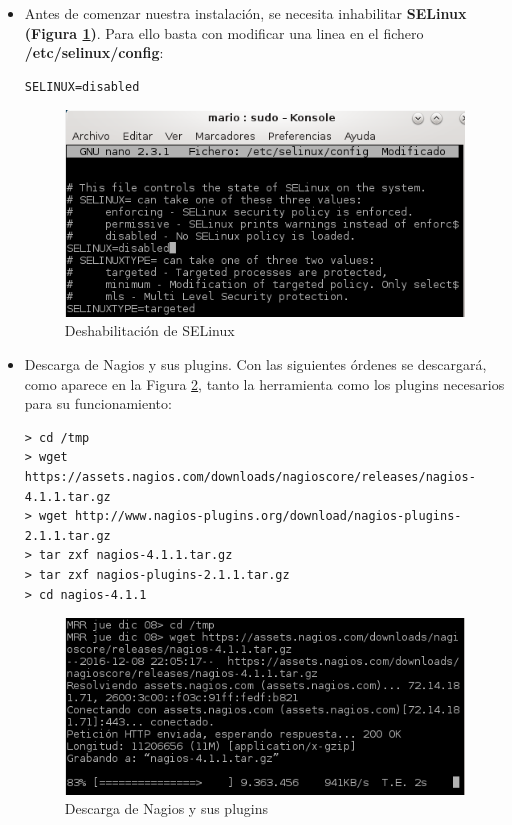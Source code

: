 \begin{itemize}
	\item Antes de comenzar nuestra instalación, se necesita inhabilitar \textbf{SELinux (Figura \ref{fig:figura123})}.
	Para ello basta con modificar una linea en el fichero \textbf{/etc/selinux/config}:
\begin{lstlisting}[style=fich]
SELINUX=disabled
\end{lstlisting}	
	\begin{figure}[H]
		\centering
		\includegraphics[scale=1]{figuras/ejercicio12/figura3.png} 
		\caption{Deshabilitación de SELinux} 
		\label{fig:figura123}
	\end{figure}

	\item Descarga de Nagios y sus plugins.
	Con las siguientes órdenes se descargará, como aparece en la Figura \ref{fig:figura124}, tanto la herramienta como los plugins necesarios para su funcionamiento:
\begin{lstlisting}[style=fich]
> cd /tmp
> wget https://assets.nagios.com/downloads/nagioscore/releases/nagios-4.1.1.tar.gz
> wget http://www.nagios-plugins.org/download/nagios-plugins-2.1.1.tar.gz
> tar zxf nagios-4.1.1.tar.gz
> tar zxf nagios-plugins-2.1.1.tar.gz
> cd nagios-4.1.1
\end{lstlisting}

	\begin{figure}[H]
		\centering
		\includegraphics[scale=1]{figuras/ejercicio12/figura4.png} 
		\caption{Descarga de Nagios y sus plugins} 
		\label{fig:figura124}
	\end{figure}


\end{itemize}
